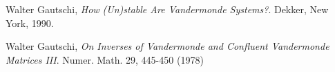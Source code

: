 \begin{thebibliography}{9}
    Walter Gautschi,
    \emph{How (Un)stable Are Vandermonde Systems?}.
    Dekker, New York,
    1990.

    Walter Gautschi,
    \emph{On Inverses of Vandermonde and Confluent Vandermonde Matrices III}.
    Numer. Math. 29, 445-450 (1978)
\end{thebibliography}

